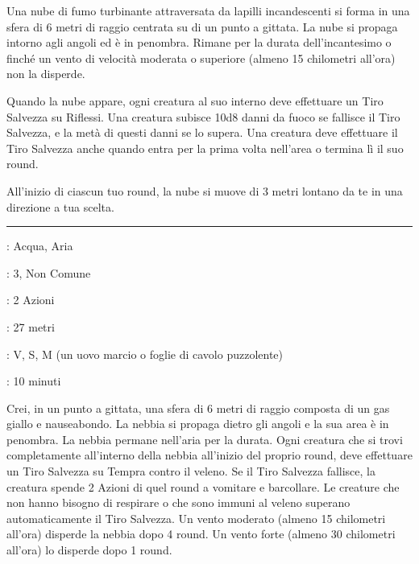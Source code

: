 \begin{multicols}{2}
Una nube di fumo turbinante attraversata da lapilli incandescenti si forma in una sfera di 6 metri di raggio centrata su di un punto a gittata. La nube si propaga intorno agli angoli ed è in penombra. Rimane per la durata dell'incantesimo o finché un vento di velocità moderata o superiore (almeno 15 chilometri all'ora) non la disperde.

Quando la nube appare, ogni creatura al suo interno deve effettuare un Tiro Salvezza su Riflessi. Una creatura subisce 10d8 danni da fuoco se fallisce il Tiro Salvezza, e la metà di questi danni se lo supera. Una creatura deve effettuare il Tiro Salvezza anche quando entra per la prima volta nell'area o termina lì il suo round.

All'inizio di ciascun tuo round, la nube si muove di 3 metri lontano da te in una direzione a tua scelta.

\smallskip\noindent\rule{\linewidth}{2pt} \hypertarget{Nebbia Nauseante}{}\smallskip{}
\noindent
\begin{description}[noitemsep, topsep=0pt, parsep=0pt, partopsep=0pt, leftmargin=0cm, labelwidth=2.8cm]
	\item[\textbf{Lista di Magia}]: Acqua, Aria
	\item[\textbf{Livello}]: 3, Non Comune
	\item[\textbf{T. di Lancio}]: 2 Azioni
	\item[\textbf{Gittata}]: 27 metri
	\item[\textbf{Componenti}]: V, S, M (un uovo marcio o foglie di cavolo puzzolente)
	\item[\textbf{Durata}]: 10 minuti
\end{description}

Crei, in un punto a gittata, una sfera di 6 metri di raggio composta di un gas giallo e nauseabondo. La nebbia si propaga dietro gli angoli e la sua area è in penombra. La nebbia permane nell'aria per la durata. Ogni creatura che si trovi completamente all'interno della nebbia all'inizio del proprio round, deve effettuare un Tiro Salvezza su Tempra contro il veleno. Se il Tiro Salvezza fallisce, la creatura spende 2 Azioni di quel round a vomitare e barcollare. Le creature che non hanno bisogno di respirare o che sono immuni al veleno superano automaticamente il Tiro Salvezza. Un vento moderato (almeno 15 chilometri all'ora) disperde la nebbia dopo 4 round. Un vento forte (almeno 30 chilometri all'ora) lo disperde dopo 1 round.


\end{multicols}
